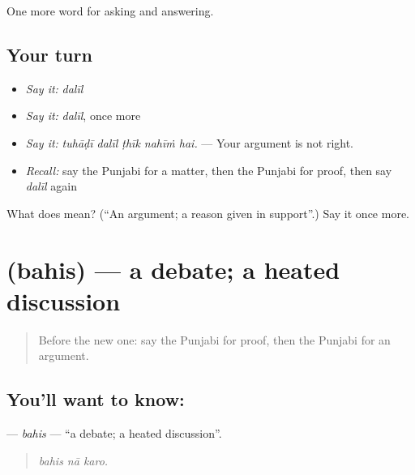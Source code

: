 \begin{grammarlens}[title={What you've built}]
One more word for asking and answering.
\end{grammarlens}

\subsection*{Your turn}
\begin{itemize}
\raggedright
  \item \emph{Say it:} \emph{dalīl}
  \item \emph{Say it:} \emph{dalīl}, once more
  \item \emph{Say it:} \emph{tuhāḍī dalīl ṭhīk nahīṁ hai.} — Your argument is not right.
  \item \emph{Recall:} say the Punjabi for a matter, then the Punjabi for proof, then say \emph{dalīl} again
\end{itemize}

\begin{tcolorbox}[breakable,colback=teal!4,colframe=teal!35!black,title={Before you move on}]
What does  mean? (\textquotedblleft{}An argument; a reason given in support\textquotedblright{}.) Say it once more.
\end{tcolorbox}
\section[\texorpdfstring{\pa{ਬਹਿਸ} (bahis)}{ਬਹਿਸ (bahis)}]{ (bahis) — a debate; a heated discussion}

\label{lesson:PA-C344-bahis}



\begin{quote}
Before the new one: say the Punjabi for proof, then the Punjabi for an argument.
\end{quote}

\subsection*{You'll want to know: }
\textbf{} — \emph{bahis} — \textquotedblleft{}a debate; a heated discussion\textquotedblright{}.

\begin{quote}
  
\end{quote}

\begin{quote}
\emph{bahis nā karo.}
\end{quote}

